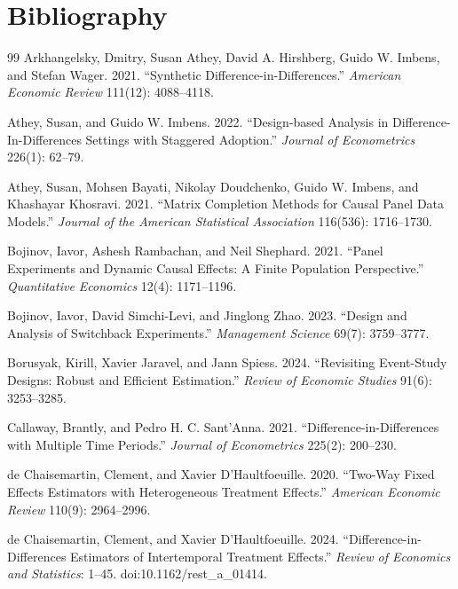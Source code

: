 \documentclass[11pt]{article}
\theoremstyle{definition}
\theoremstyle{plain}
\theoremstyle{remark}
\begin{document}
\section*{Bibliography}
\begin{thebibliography}{99}
Arkhangelsky, Dmitry, Susan Athey, David A. Hirshberg, Guido W. Imbens, and Stefan Wager.
2021.
``Synthetic Difference-in-Differences.''
\emph{American Economic Review} 111(12): 4088--4118.

Athey, Susan, and Guido W. Imbens.
2022.
``Design-based Analysis in Difference-In-Differences Settings with Staggered Adoption.''
\emph{Journal of Econometrics} 226(1): 62--79.

Athey, Susan, Mohsen Bayati, Nikolay Doudchenko, Guido W. Imbens, and Khashayar Khosravi.
2021.
``Matrix Completion Methods for Causal Panel Data Models.''
\emph{Journal of the American Statistical Association} 116(536): 1716--1730.

Bojinov, Iavor, Ashesh Rambachan, and Neil Shephard.
2021.
``Panel Experiments and Dynamic Causal Effects: A Finite Population Perspective.''
\emph{Quantitative Economics} 12(4): 1171--1196.

Bojinov, Iavor, David Simchi-Levi, and Jinglong Zhao.
2023.
``Design and Analysis of Switchback Experiments.''
\emph{Management Science} 69(7): 3759--3777.

Borusyak, Kirill, Xavier Jaravel, and Jann Spiess.
2024.
``Revisiting Event-Study Designs: Robust and Efficient Estimation.''
\emph{Review of Economic Studies} 91(6): 3253--3285.

Callaway, Brantly, and Pedro H. C. Sant'Anna.
2021.
``Difference-in-Differences with Multiple Time Periods.''
\emph{Journal of Econometrics} 225(2): 200--230.

de Chaisemartin, Clement, and Xavier D'Haultfoeuille.
2020.
``Two-Way Fixed Effects Estimators with Heterogeneous Treatment Effects.''
\emph{American Economic Review} 110(9): 2964--2996.

de Chaisemartin, Clement, and Xavier D'Haultfoeuille.
2024.
``Difference-in-Differences Estimators of Intertemporal Treatment Effects.''
\emph{Review of Economics and Statistics}: 1--45.
doi:10.1162/rest\_a\_01414.


\end{thebibliography}
\end{document}
